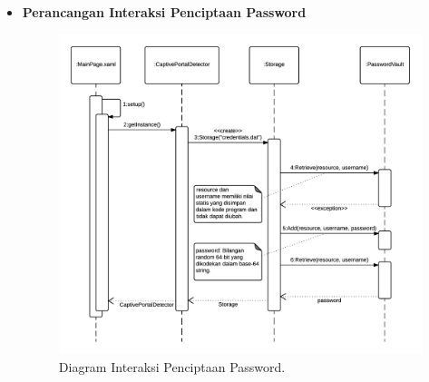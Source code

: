 \documentclass[a4paper,twoside]{article}
\begin{document}
\begin{enumerate}
\begin{itemize}
{\begin{itemize}
{                        \begin{enumerate}
                            \item{Saat komputer mengalami perubahan jaringan (tidak terhubung menjadi terhubung dan sebaliknya, atau terjadi perubahan \textit{cost} jaringan), \textit{trigger} NetworkStateChange akan diaktifkan oleh Windows, dan objek NetChangeDetectorBackgroundTask yang sudah didaftarkan akan menerima \textit{trigger} tersebut.}
                            \item{Jika kondisi \texttt{connectionChanged() \&\& lastSSID!=null \&\& hasNoInternetAccess()} terpenuhi, maka:}
                            \begin{enumerate}
                                \item{NetChangeDetectorBackgroundTask memerintahkan ToastNotifier untuk memunculkan notifikasi menggunakan method Show().}
                                \item{Saat user menekan tombol "Yes" pada notifikasi, App.xaml diaktivasi.}
                            \end{enumerate}
                        \end{enumerate}
                    }
                    \item{
                        {\bf Perancangan Interaksi Penciptaan Password}
                        \begin{figure}[!htb]
                            \centering
                            \includegraphics[scale=0.9]{SequenceDiagramPasswordGeneration.png}
                            \caption[Diagram Interaksi Penciptaan Password.]{Diagram Interaksi Penciptaan Password.} 
                            \label{fig:PasswordGenerationSequenceDiagram}
                        \end{figure}

}
\end{itemize}}
\end{itemize}
\end{enumerate}
\end{document}
